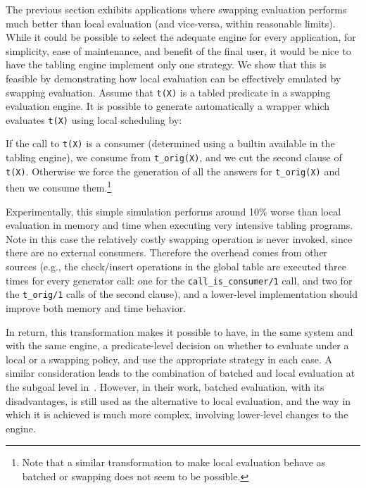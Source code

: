\documentclass{./tlp}
\newenvironment{pcode}
    {\begin{lstlisting}[language=prolog,morekeywords=call,morekeywords=table]}
    {\end{lstlisting}}
\begin{document}
The previous section exhibits applications where swapping
evaluation performs much better than local evaluation (and vice-versa,
within reasonable limits).  While it could be possible to select the
adequate engine for every application, for simplicity, ease of
maintenance, and benefit of the final user, it would be nice to have
the tabling engine implement only one strategy.
We show that this is feasible by demonstrating how local evaluation can be
effectively emulated by swapping evaluation.  Assume that
\lstinline{t(X)} is a tabled predicate in a swapping evaluation
engine.  It is possible to generate automatically a wrapper which
evaluates \lstinline{t(X)} using local scheduling by:



If the call to \lstinline{t(X)} is a consumer (determined using a
builtin available in the tabling engine), we consume from
\lstinline{t_orig(X)}, and we cut the second clause of
\lstinline{t(X)}.  Otherwise we force the generation of all the
answers for \lstinline{t_orig(X)} and then we consume
them.\footnote{Note that a similar transformation to make local
  evaluation behave as  batched or swapping
does not seem to be possible.}

Experimentally, this simple simulation performs around 10\% worse than
local evaluation in memory and time when executing very intensive
tabling programs.  Note in this case the relatively costly swapping
operation is never invoked, since there are no external consumers.
Therefore the overhead comes from other sources (e.g., the
check/insert operations in the global table are executed three times
for every generator call: one for the \lstinline{call_is_consumer/1}
call, and two for the \lstinline{t_orig/1} calls of the second
clause), and 
a lower-level implementation should improve both memory and
time behavior.

In return, this transformation makes it possible to have, in the same
system and with the same engine, a predicate-level decision on whether
to evaluate under a local or a swapping policy, and use the
appropriate strategy in each case.  A similar consideration leads to
the combination of batched and local evaluation at the subgoal level
in~\cite{iclp/RochaSC05}.  However, in their work, batched evaluation,
with its disadvantages, is still used as the alternative to local
evaluation, and the way in which it is achieved is much more complex,
involving lower-level changes to the engine.
\end{document}
